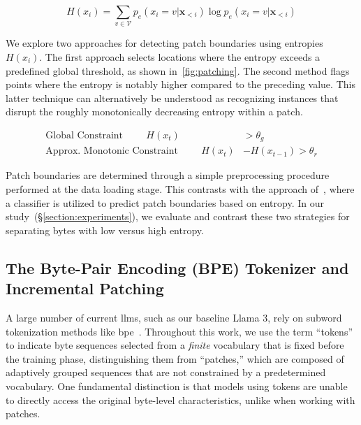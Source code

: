 \begin{equation}
H(x_i) = \sum_{v \in \mathcal{V}} p_{e}(x_i=v|\pmb{x}_{<i}) \log p_{e}(x_i=v|\pmb{x}_{<i})
\end{equation}

We explore two approaches for detecting patch boundaries using entropies $H(x_i)$. The first approach selects locations where the entropy exceeds a predefined global threshold, as shown in~\autoref{fig:patching}. The second method flags points where the entropy is notably higher compared to the preceding value. This latter technique can alternatively be understood as recognizing instances that disrupt the roughly monotonically decreasing entropy within a patch.

\begin{align*}
    \text{Global Constraint}\hspace{1cm}H(x_t)& > \theta_g\\
    \text{Approx. Monotonic Constraint}\hspace{1cm}H(x_t)& - H(x_{t-1}) > \theta_r
\end{align*}

Patch boundaries are determined through a simple preprocessing procedure performed at the data loading stage. This contrasts with the approach of~\citet{nawrot-etal-2023-efficient}, where a classifier is utilized to predict patch boundaries based on entropy. In our study~(\S\ref{section:experiments}), we evaluate and contrast these two strategies for separating bytes with low versus high entropy.

\subsection{The Byte-Pair Encoding (BPE) Tokenizer and Incremental Patching}
\label{section:incremental-patching}
\label{section:bpe-patch}

A large number of current llms, such as our baseline Llama 3, rely on subword tokenization methods like bpe~\citep{gage1994new, sennrich-etal-2016-neural}. Throughout this work, we use the term ``tokens'' to indicate byte sequences selected from a \textit{finite} vocabulary that is fixed before the training phase, distinguishing them from ``patches,'' which are composed of adaptively grouped sequences that are not constrained by a predetermined vocabulary. One fundamental distinction is that models using tokens are unable to directly access the original byte-level characteristics, unlike when working with patches.


